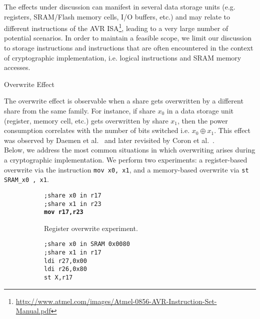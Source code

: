 The effects under discussion can manifest in several data storage units (e.g. registers, SRAM/Flash memory cells, I/O buffers, etc.) and may relate to different instructions of the AVR ISA\footnote{\url{http://www.atmel.com/images/Atmel-0856-AVR-Instruction-Set-Manual.pdf}}, leading to a very large number of potential scenarios. In order to maintain a feasible scope, we limit our discussion to storage instructions and instructions that are often encountered in the context of cryptographic implementation, i.e. logical instructions and SRAM memory accesses.
\begin{subsection}{Overwrite Effect}\label{overwrite}

The overwrite effect is observable when a share gets overwritten by a different share from the same family. For instance, if share $x_0$ in a data storage unit (register, memory cell, etc.) gets overwritten by share $x_1$, then the power consumption correlates with the number of bits switched i.e. $x_0 \oplus x_1$. This effect was observed by Daemen et al.~\cite{noteonsca} and later revisited by Coron et al.~\cite{DBLP:conf/cosade/CoronGPRRV12}.\\
 Below, we address the most common situations in which overwriting arises during a cryptographic implementation. We perform two experiments: a register-based overwrite via the instruction \texttt{mov x0, x1}, and a memory-based overwrite via \texttt{st SRAM\_x0 ,  x1}. 
\begin{figure}[H]
    \centering
\begin{subfigure}[b]{0.4\textwidth}
      \texttt{;share x0 in r17 \\
;share x1 in r23 \\
\textbf{mov r17,r23}\\
			}

        \caption{\scriptsize{Register overwrite experiment.}}

    \end{subfigure}
 \begin{subfigure}[b]{0.4\textwidth}
         \texttt{;share x0 in SRAM 0x0080 \\
;share x1 in r17  \\
ldi r27,0x00 \\
ldi r26,0x80 \\
st X,r17\\
}


\end{subfigure}
\end{figure}
\end{subsection}

